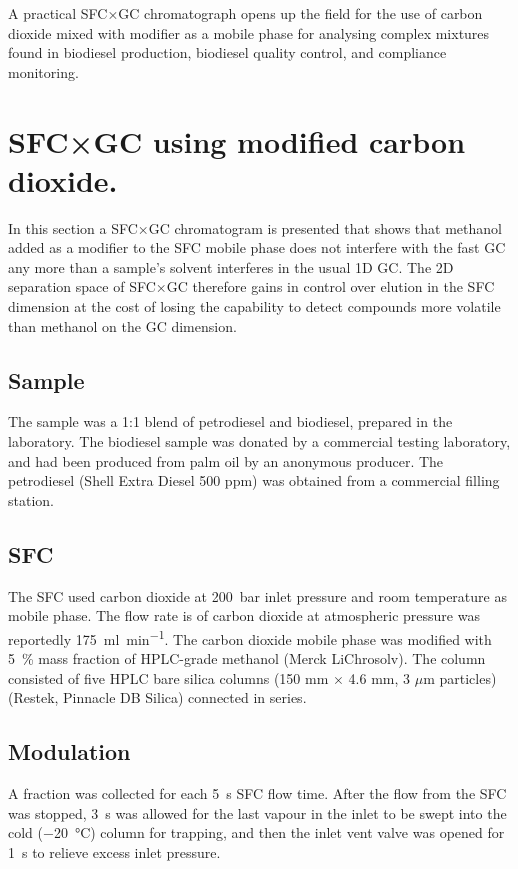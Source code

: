 A practical SFC×GC chromatograph opens up the field for the use of carbon
dioxide mixed with modifier as a mobile phase for analysing complex mixtures
found in biodiesel production, biodiesel quality control, and compliance
monitoring.

\section[SFC×GC with modifier]{SFC×GC using modified carbon dioxide.}

In this section a SFC×GC chromatogram is presented that shows that methanol
added as a modifier to the SFC mobile phase does not interfere with the fast GC
any more than a sample's solvent interferes in the usual 1D GC. The 2D
separation space of SFC×GC therefore gains in control over elution in the SFC
dimension at the cost of losing the capability to detect compounds
more volatile than methanol on the GC dimension.

\subsection{Sample}

The sample was a 1:1 blend of petrodiesel and biodiesel, prepared in the
laboratory. The biodiesel sample was donated by a commercial testing laboratory,
and had been produced from palm oil by an anonymous producer. The petrodiesel
(Shell Extra Diesel 500 ppm) was obtained from a commercial filling station.

\subsection{SFC}

The SFC used carbon dioxide at \SI{200}{\bar} inlet pressure and room
temperature as mobile phase. The flow rate is of carbon dioxide at atmospheric
pressure was reportedly \SI{175}{\milli\litre\per\minute}. The carbon dioxide
mobile phase was modified with \SI{5}{\percent} mass fraction of HPLC-grade
methanol (Merck LiChrosolv). The column consisted of five HPLC bare silica
columns (150 mm $\times$ 4.6 mm, 3 $\mu$m particles) (Restek, Pinnacle DB
Silica) connected in series.

\subsection{Modulation}

A fraction was collected for each \SI{5}{\second} SFC flow time. After the flow
from the SFC was stopped, \SI{3}{\second} was allowed for the last vapour in the
inlet to be swept into the cold (\SI{-20}{\celsius}) column for trapping, and
then the inlet vent valve was opened for \SI{1}{\second} to relieve excess inlet
pressure.

